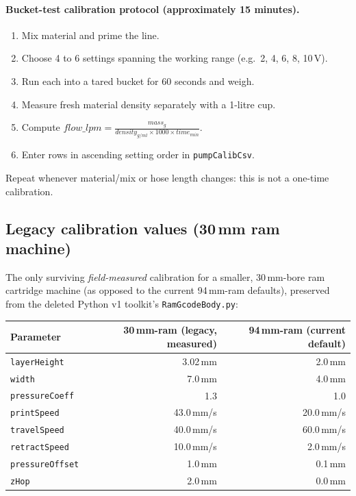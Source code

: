 \documentclass[11pt]{article}
\newcommand{\param}[1]{\texttt{#1}}
\begin{document}
\paragraph{Bucket-test calibration protocol (approximately 15 minutes).}
\begin{enumerate}
  \item Mix material and prime the line.
  \item Choose 4 to 6 settings spanning the working range (e.g.\ 2, 4, 6, 8, 10\,V).
  \item Run each into a tared bucket for 60 seconds and weigh.
  \item Measure fresh material density separately with a 1-litre cup.
  \item Compute \(flow\_lpm = \frac{mass_g}{density_{g/ml} \times 1000 \times time_{min}}\).
  \item Enter rows in ascending setting order in \param{pumpCalibCsv}.
\end{enumerate}
Repeat whenever material/mix or hose length changes: this is not a
one-time calibration.

\subsection{Legacy calibration values (30\,mm ram machine)}

The only surviving \emph{field-measured} calibration for a smaller,
30\,mm-bore ram cartridge machine (as opposed to the current 94\,mm-ram
defaults), preserved from the deleted Python v1 toolkit's
\param{RamGcodeBody.py}:

\begin{longtable}{@{}lrr@{}}
\toprule
\textbf{Parameter} & \textbf{30\,mm-ram (legacy, measured)} & \textbf{94\,mm-ram (current default)} \\
\midrule
\endhead
\param{layerHeight} & 3.02\,mm & 2.0\,mm \\
\param{width} & 7.0\,mm & 4.0\,mm \\
\param{pressureCoeff} & 1.3 & 1.0 \\
\param{printSpeed} & 43.0\,mm/s & 20.0\,mm/s \\
\param{travelSpeed} & 40.0\,mm/s & 60.0\,mm/s \\
\param{retractSpeed} & 10.0\,mm/s & 2.0\,mm/s \\
\param{pressureOffset} & 1.0\,mm & 0.1\,mm \\
\param{zHop} & 2.0\,mm & 0.0\,mm \\
\bottomrule
\end{longtable}
\end{document}
